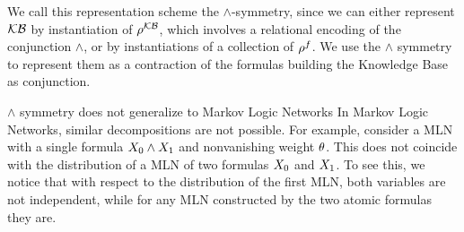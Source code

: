 We call this representation scheme the $\land$-symmetry, since we can either represent $\mathcal{KB}$ by instantiation of $\rho^{\mathcal{KB}}$, which involves a relational encoding of the conjunction $\land$, or by instantiations of a collection of $\rho^{f}$.
We use the $\land$ symmetry to represent them as a contraction of the formulas building the Knowledge Base as conjunction.

\begin{remark}{$\land$ symmetry does not generalize to Markov Logic Networks} %
	In Markov Logic Networks, similar decompositions are not possible.
	For example, consider a MLN with a single formula $X_{0}\land X_{1}$ and nonvanishing weight $\theta$.
	This does not coincide with the distribution of a MLN of two formulas $X_{0}$ and $X_{1}$.
	To see this, we notice that with respect to the distribution of the first MLN, both variables are not independent, while for any MLN constructed by the two atomic formulas they are.
\end{remark}


%
%




